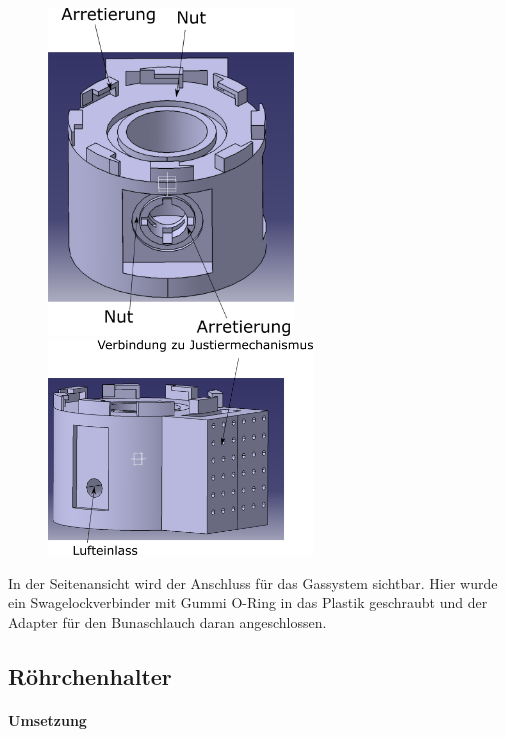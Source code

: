 \begin{figure}[h]
	\begin{minipage}[hbt]{6.5cm}
		\centering
		\includegraphics[width=6.5cm]{Zylinder_frontal.png}
	\end{minipage}
	\hfill
	\begin{minipage}[hbt]{7cm}
		\centering
		\includegraphics[width=7cm]{Zylinder_seitlich.png}
	\end{minipage}
\end{figure}

In der Seitenansicht wird der Anschluss für das Gassystem sichtbar. Hier wurde ein Swagelockverbinder mit Gummi O-Ring in das Plastik geschraubt und der Adapter für den Bunaschlauch daran angeschlossen.


\subsection{Röhrchenhalter}

\paragraph{Umsetzung}

